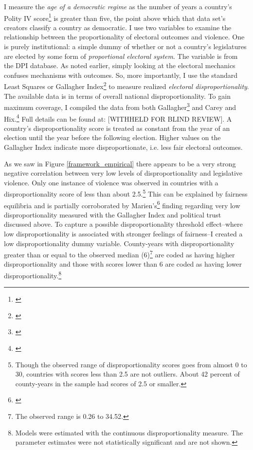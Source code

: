 \documentclass[a4paper]{article}\usepackage[]{graphicx}\usepackage[]{color}
\begin{document}
I measure the {\emph{age of a democratic regime}} as the number of years a country's Polity IV score\footnote{\citealt{Marshall2009}} is greater than five, the point above which that data set's creators classify a country as democratic. I use two variables to examine the relationship between the proportionality of electoral outcomes and violence. One is purely institutional: a simple dummy of whether or not a country's legislatures are elected by some form of {\emph{proportional electoral system}}. The variable is from the DPI database. As noted earlier, simply looking at the electoral mechanics confuses mechanisms with outcomes. So, more importantly, I use the standard Least Squares or Gallagher Index\footnote{\citealt{Gallagher1991}} to measure realized {\emph{electoral disproportionality}}. The available data is in terms of overall national disproportionality. To gain maximum coverage, I compiled the data from both Gallagher\footnote{\citealt{Gallagher2012}} and Carey and Hix.\footnote{\citealt{Carey2011}} Full details can be found at: [WITHHELD FOR BLIND REVIEW]. A country's disproportionality score is treated as constant from the year of an election until the year before the following election. Higher values on the Gallagher Index indicate more disproportionate, i.e. less fair electoral outcomes. 

As we saw in Figure \ref{framework_empirical} there appears to be a very strong negative correlation between very low levels of disproportionality and legislative violence. Only one instance of violence was observed in countries with a disproportionality score of less than about 2.5.\footnote{Though the observed range of disproportionality scores goes from almost 0 to 30, countries with scores less than 2.5 are not outliers. About 42 percent of county-years in the sample had scores of 2.5 or smaller.} This can be explained by fairness equilibria and is partially corroborated by Marien's\footnote{\citealt{Marien2011}} finding regarding very low disproportionality measured with the Gallagher Index and political trust discussed above. To capture a possible disproportionality threshold effect--where low disproportionality is associated with stronger feelings of fairness--I created a low disproportionality dummy variable. County-years with disproportionality greater than or equal to the observed median (6)\footnote{The observed range is 0.26 to 34.52.} are coded as having higher disproportionality and those with scores lower than 6 are coded as having lower disproportionality.\footnote{Models were estimated with the continuous disproportionality measure. The parameter estimates were not statistically significant and are not shown.} 
\end{document}
